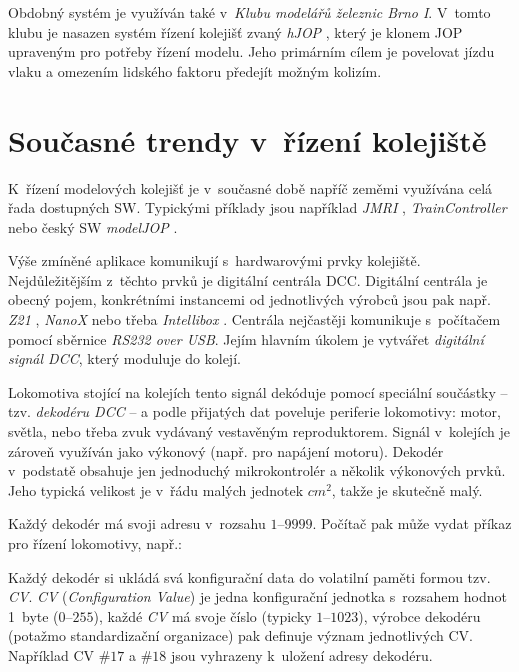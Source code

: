 Obdobný systém je využíván také v~\textit{Klubu modelářů železnic Brno I}.
V~tomto klubu je nasazen systém řízení kolejišť zvaný \textit{hJOP}
\cite{hjop:web}, který je klonem JOP upraveným pro potřeby řízení modelu. Jeho
primárním cílem je povelovat jízdu vlaku a omezením lidského faktoru předejít
možným kolizím.

\section{Současné trendy v~řízení kolejiště}

K~řízení modelových kolejišť je v~současné době napříč zeměmi využívána celá
řada dostupných SW. Typickými příklady jsou například \textit{JMRI}
\cite{jmri:web}, \textit{TrainController} \cite{traincontroller:web}
nebo český SW \textit{modelJOP} \cite{modeljop:web}.

Výše zmíněné aplikace komunikují s~hardwarovými prvky kolejiště.
Nejdůležitějším z~těchto prvků je digitální centrála DCC. Digitální centrála je
obecný pojem, konkrétními instancemi od jednotlivých výrobců jsou pak např.
\textit{Z21} \cite{z21:web}, \textit{NanoX} \cite{nanox:web} nebo třeba
\textit{Intellibox} \cite{intellibox:web}. Centrála nejčastěji komunikuje
s~počítačem pomocí sběrnice \textit{RS232 over USB}. Jejím hlavním úkolem je
vytvářet \textit{digitální signál DCC}, který moduluje do kolejí.

Lokomotiva stojící na kolejích tento signál dekóduje pomocí spe\-ciál\-ní
součástky -- tzv. \textit{dekodéru DCC} -- a podle přijatých dat poveluje periferie
lokomotivy: motor, světla, nebo třeba zvuk vydávaný vestavěným reproduktorem.
Signál v~kolejích je zároveň využíván jako výkonový (např. pro napájení
motoru). Dekodér v~podstatě obsahuje jen jednoduchý mikrokontrolér a několik
výkonových prvků. Jeho typická velikost je v~řádu malých jednotek $cm^2$, takže
je skutečně malý.

Každý dekodér má svoji adresu v~rozsahu $1$--$9999$. Počítač pak může vydat příkaz
pro řízení lokomotivy, např.: \textit{}

Každý dekodér si ukládá svá konfigurační data do volatilní paměti formou tzv.
\textit{CV}. \textit{CV} (\textit{Configuration Value}) je jedna konfigurační
jednotka s~rozsahem hodnot 1~byte ($0$--$255$), každé \textit{CV} má svoje číslo
(typicky $1$--$1023$), výrobce dekodéru (potažmo standardizační organizace) pak
definuje význam jednotlivých CV. Například CV $\#17$ a $\#18$ jsou vyhrazeny
k~uložení adresy dekodéru.

